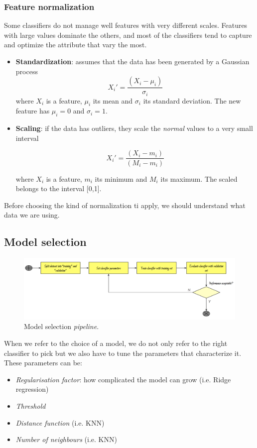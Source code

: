 \subsubsection{Feature normalization}

Some classifiers do not manage well features with very different scales. Features with large values dominate the others, and most of the classifiers tend to capture and optimize the attribute that vary the most.

\begin{itemize}
\item \textbf{Standardization}: assumes that the data has been generated by a Gaussian process 
$$X_i' = \frac{(X_i - \mu_i)}{\sigma_i}$$
where $X_i$ is a feature, $\mu_i$ its mean and $\sigma_i$ its standard deviation. The new feature has $\mu_i = 0$ and $\sigma_i = 1$.

\item \textbf{Scaling}: if the data has outliers, they scale the \emph{normal} values to a very small interval

$$X_i' = \frac{(X_i - m_i)}{(M_i - m_i)}$$

where $X_i$ is a feature, $m_i$ its minimum and $M_i$ its maximum. The scaled belongs to the interval [0,1].

\end{itemize}

Before choosing the kind of normalization ti apply, we should understand what data we are using.

\subsection{Model selection}

\begin{figure}[H]%
 \centering
 \includegraphics[width=13cm]{./img/08/model_selection}
 \caption{\label{pic:model_selection} Model selection \emph{pipeline}.}
\end{figure}

When we refer to the choice of a model, we do not only refer to the right classifier to pick but we also have to tune the parameters that characterize it. These parameters can be:
\begin{itemize}
\item \emph{Regularisation factor}: how complicated the model can grow (i.e. Ridge regression)
\item \emph{Threshold} 
\item \emph{Distance function} (i.e. KNN)
\item \emph{Number of neighbours} (i.e. KNN)
\end{itemize}


